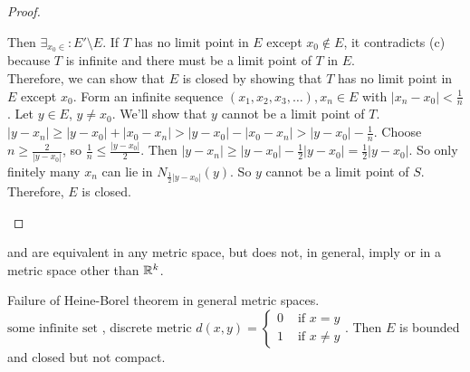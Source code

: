 \begin{thm}[41]
\begin{proof}
\begin{description}
			      Then $\exists_{x_0 \in }: E' \setminus E$.
			      If $T$ has no limit point in $E$ except $x_0 \not\in E$, it contradicts (c) because $T$ is infinite and there must be a limit point of $T$ in $E$.\\
			      Therefore, we can show that $E$ is closed by showing that $T$ has no limit point in $E$ except $x_0$.
			      Form an infinite sequence $(x_1,x_2, x_3, \ldots ), x_n \in E$ with $|x_n -x_0|<\frac{1}{n}$.
			      Let $y \in E$, $y\neq x_0$. We'll show that $y$ cannot be a limit point of $T$.
			      $|y-x_n|\ge |y-x_0|+|x_0-x_n|> |y-x_0|-|x_0-x_n| >|y-x_0|-\frac{1}{n}$. Choose $n\ge \frac{2}{|y-x_0|}$, so $\frac{1}{n}\le \frac{|y-x_0|}{2}$. Then $|y-x_n|\ge |y-x_0|-\frac{1}{2}|y-x_0|=\frac{1}{2}|y-x_0|$. So only finitely many $x_{n}$ can lie in $N_{\frac{1}{2}|y-x_0|}(y)$.
			      So $y$ cannot be a limit point of $S$. Therefore, $E$ is closed.
		\end{description}
	\end{proof}
	\begin{remark}
		 and  are equivalent in any metric space, but  does not, in general, imply  or  in a metric space other than $\mathbb{R}^{k}$.
	\end{remark}

\end{thm}

\begin{example}
	Failure of Heine-Borel theorem in general metric spaces.\\
	$\text{some infinite set}$ , discrete metric $d(x,y)=
		\begin{cases}
			0 & \text{ if } x=y     \\
			1 & \text{ if } x\neq y
		\end{cases}
	$.
	Then $E$ is bounded and closed but not compact.
\end{example}

